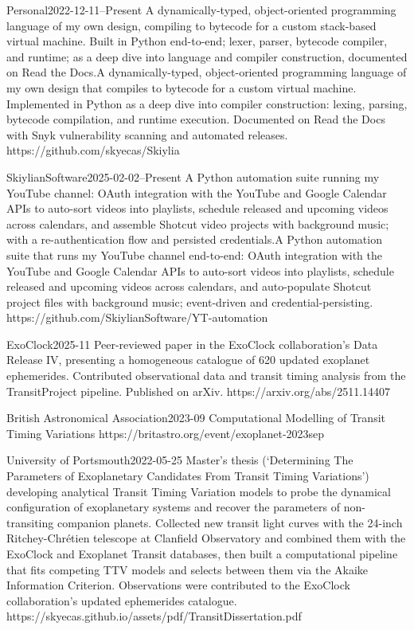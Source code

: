{Personal}{2022-12-11--Present}
{\iflean A dynamically-typed, object-oriented programming language of my own design, compiling to bytecode for a custom stack-based virtual machine. Built in Python end-to-end; lexer, parser, bytecode compiler, and runtime; as a deep dive into language and compiler construction, documented on Read the Docs.\else A dynamically-typed, object-oriented programming language of my own design that compiles to bytecode for a custom virtual machine. Implemented in Python as a deep dive into compiler construction: lexing, parsing, bytecode compilation, and runtime execution. Documented on Read the Docs with Snyk vulnerability scanning and automated releases.\fi}
{https://github.com/skyecas/Skiylia}

{SkiylianSoftware}{2025-02-02--Present}
{\iflean A Python automation suite running my YouTube channel: OAuth integration with the YouTube and Google Calendar APIs to auto-sort videos into playlists, schedule released and upcoming videos across calendars, and assemble Shotcut video projects with background music; with a re-authentication flow and persisted credentials.\else A Python automation suite that runs my YouTube channel end-to-end: OAuth integration with the YouTube and Google Calendar APIs to auto-sort videos into playlists, schedule released and upcoming videos across calendars, and auto-populate Shotcut project files with background music; event-driven and credential-persisting.\fi}
{https://github.com/SkiylianSoftware/YT-automation}

{ExoClock}{2025-11}
{Peer-reviewed paper in the ExoClock collaboration's Data Release IV, presenting a homogeneous catalogue of 620 updated exoplanet ephemerides. Contributed observational data and transit timing analysis from the TransitProject pipeline. Published on arXiv.}
{https://arxiv.org/abs/2511.14407}

\iflean\else
{}
{British Astronomical Association}{2023-09}
{Computational Modelling of Transit Timing Variations}
{https://britastro.org/event/exoplanet-2023sep}

{University of Portsmouth}{2022-05-25}
{Master's thesis (`Determining The Parameters of Exoplanetary Candidates From Transit Timing Variations') developing analytical Transit Timing Variation models to probe the dynamical configuration of exoplanetary systems and recover the parameters of non-transiting companion planets. Collected new transit light curves with the 24-inch Ritchey-Chr\'etien telescope at Clanfield Observatory and combined them with the ExoClock and Exoplanet Transit databases, then built a computational pipeline that fits competing TTV models and selects between them via the Akaike Information Criterion. Observations were contributed to the ExoClock collaboration's updated ephemerides catalogue.}
{https://skyecas.github.io/assets/pdf/TransitDissertation.pdf}

